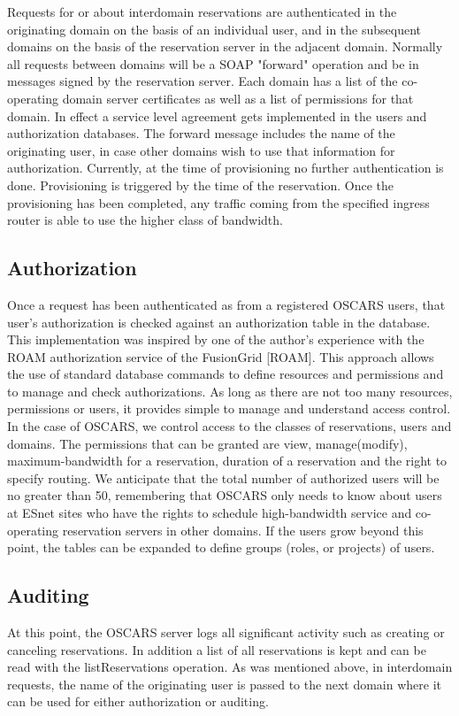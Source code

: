 \documentclass[conference]{IEEEtran}
\begin{document}
Requests for or about interdomain
reservations are authenticated in the originating domain on the basis
of an individual user, and in the subsequent domains on the basis of
the reservation server in the adjacent domain. Normally all requests
between domains will be a SOAP "forward" operation and be in messages
signed by the reservation server. Each domain has a list of the
co-operating domain server certificates as well as a list of
permissions for that domain. In effect a service level agreement gets
implemented in the users and authorization databases. The forward
message includes the name of the originating user, in case other
domains wish to use that information for authorization.
 Currently, at
the time of provisioning no further authentication is
done. Provisioning is triggered by the time of the reservation. Once
the provisioning has been completed, any traffic coming from the
specified ingress router is able to use the higher class of bandwidth.

\subsection{Authorization}
Once a request has been authenticated as from a registered OSCARS
users, that user's authorization is checked against an authorization
table in the database. This implementation was inspired by one of the
author's experience with the ROAM authorization service of the
FusionGrid [ROAM]. This approach allows the use of standard database
commands to define resources and permissions and to manage and check
authorizations. As long as there are not too many resources,
permissions or users, it provides simple to manage and understand
access control. In the case of OSCARS, we control access to the
classes of reservations, users and domains. The permissions that can
be granted are view, manage(modify), maximum-bandwidth for a
reservation, duration of a reservation and the right to specify
routing.  We anticipate that the total number of authorized users will
be no greater than 50, remembering that OSCARS only needs to know
about users at ESnet sites who have the rights to schedule
high-bandwidth service and co-operating reservation servers in other
domains. If the users grow beyond this point, the tables can be
expanded to define groups (roles, or projects) of users.

\subsection{Auditing}
At this point, the OSCARS server logs all significant activity such as
creating or canceling reservations. In addition a list of all
reservations is kept and can be read with the listReservations
operation. As was mentioned above, in interdomain requests, the name
of the originating user is passed to the next domain where it can be
used for either authorization or auditing.
\end{document}
